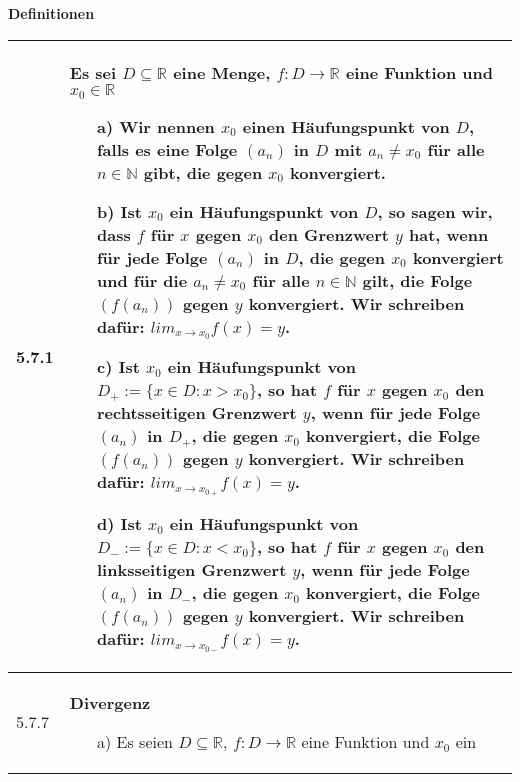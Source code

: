     \noindent
    \textbf{Definitionen}
    \begin{table}[H]  
    \begin{tabularx}{\textwidth}{X m{16cm}}
        \toprule

        5.7.1 & Es sei $D \subseteq \mathbb{R}$ eine Menge, $f: D \rightarrow \mathbb{R}$ eine Funktion und $x_0 \in \mathbb{R}$
                \begin{itemize}[topsep=-0.5cm]
                    \item[a)] Wir nennen $x_0$ einen \textbf{Häufungspunkt} von $D$, falls es eine Folge $(a_n)$ in $D$ mit
                                $a_n \neq x_0$ für alle $n \in \mathbb{N}$ gibt, die gegen $x_0$ konvergiert.
                    \item[b)] Ist $x_0$ ein Häufungspunkt von $D$, so sagen wir, dass $f$ für $x$ gegen $x_0$ den Grenzwert 
                                $y$ hat, wenn für jede Folge $(a_n)$ in $D$, die gegen $x_0$ konvergiert und für die
                                $a_n \neq x_0$ für alle $n \in \mathbb{N}$ gilt, die Folge $(f(a_n))$ gegen $y$ konvergiert.
                                \hfill \break Wir schreiben dafür: $lim_{x \rightarrow x_0} f(x) = y$.
                    \item[c)] Ist $x_0$ ein Häufungspunkt von $D_+ := \{ x \in D : x > x_0\}$, so hat $f$ für $x$ gegen $x_0$
                                den \textbf{rechtsseitigen Grenzwert} $y$, wenn für jede Folge $(a_n)$ in $D_+$, die gegen
                                $x_0$ konvergiert, die Folge $(f(a_n))$ gegen $y$ konvergiert.
                                \hfill \break Wir schreiben dafür: $lim_{x \rightarrow x_{0+}} f(x) = y$.
                    \item[d)] Ist $x_0$ ein Häufungspunkt von $D_- := \{ x \in D : x < x_0\}$, so hat $f$ für $x$ gegen $x_0$
                                den \textbf{linksseitigen Grenzwert} $y$, wenn für jede Folge $(a_n)$ in $D_-$, die gegen
                                $x_0$ konvergiert, die Folge $(f(a_n))$ gegen $y$ konvergiert.
                                \hfill \break Wir schreiben dafür: $lim_{x \rightarrow x_{0-}} f(x) = y$.
                \end{itemize} \vspace{-0cm} \\
        \midrule
        5.7.7 & \textbf{Divergenz}
                \begin{itemize}[topsep=-0.5cm]
                    \item[a)] Es seien $D \subseteq \mathbb{R}$, $f: D \rightarrow \mathbb{R}$ eine Funktion und $x_0$ ein

\end{itemize}
\end{tabularx}
\end{table}
